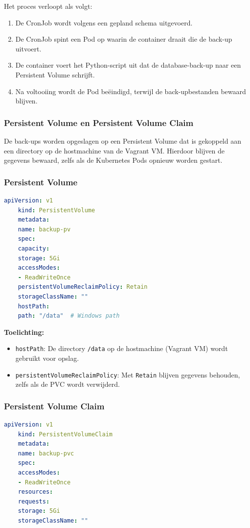 Het proces verloopt als volgt:
\begin{enumerate}
    \item De CronJob wordt volgens een gepland schema uitgevoerd.
    \item De CronJob spint een Pod op waarin de container draait die de back-up uitvoert.
    \item De container voert het Python-script uit dat de database-back-up naar een Persistent Volume schrijft.
    \item Na voltooiing wordt de Pod beëindigd, terwijl de back-upbestanden bewaard blijven.
\end{enumerate}

\subsubsection{Persistent Volume en Persistent Volume Claim}

De back-ups worden opgeslagen op een Persistent Volume dat is gekoppeld aan een directory op de hostmachine van de Vagrant VM. Hierdoor blijven de gegevens bewaard, zelfs als de Kubernetes Pods opnieuw worden gestart.

\subsubsection*{Persistent Volume}
\begin{lstlisting}[language=yaml, caption=Persistent Volume Configuratie]
    apiVersion: v1
    kind: PersistentVolume
    metadata:
    name: backup-pv
    spec:
    capacity:
    storage: 5Gi
    accessModes:
    - ReadWriteOnce
    persistentVolumeReclaimPolicy: Retain
    storageClassName: ""
    hostPath:
    path: "/data"  # Windows path
\end{lstlisting}

\textbf{Toelichting:}
\begin{itemize}
    \item \texttt{hostPath}: De directory \texttt{/data} op de hostmachine (Vagrant VM) wordt gebruikt voor opslag.
    \item \texttt{persistentVolumeReclaimPolicy}: Met \texttt{Retain} blijven gegevens behouden, zelfs als de PVC wordt verwijderd.
\end{itemize}

\subsubsection*{Persistent Volume Claim}
\begin{lstlisting}[language=yaml, caption=Persistent Volume Claim Configuratie]
    apiVersion: v1
    kind: PersistentVolumeClaim
    metadata:
    name: backup-pvc
    spec:
    accessModes:
    - ReadWriteOnce
    resources:
    requests:
    storage: 5Gi
    storageClassName: ""
\end{lstlisting}

